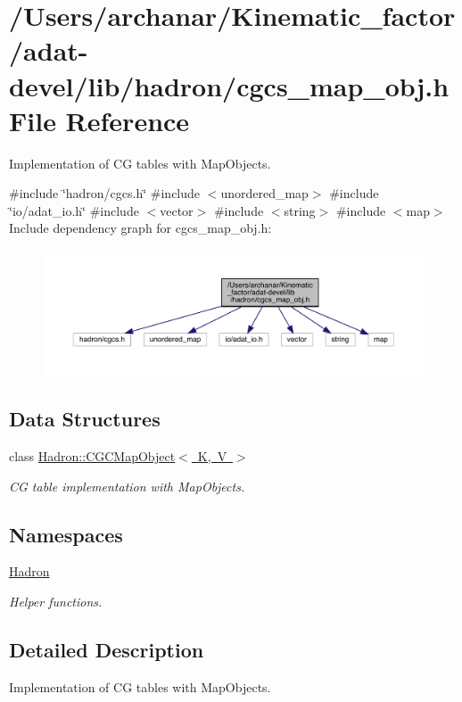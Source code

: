 \hypertarget{adat-devel_2lib_2hadron_2cgcs__map__obj_8h}{}\section{/\+Users/archanar/\+Kinematic\+\_\+factor/adat-\/devel/lib/hadron/cgcs\+\_\+map\+\_\+obj.h File Reference}
\label{adat-devel_2lib_2hadron_2cgcs__map__obj_8h}


Implementation of CG tables with Map\+Objects.  


{\ttfamily \#include \char`\"{}hadron/cgcs.\+h\char`\"{}}\newline
{\ttfamily \#include $<$unordered\+\_\+map$>$}\newline
{\ttfamily \#include \char`\"{}io/adat\+\_\+io.\+h\char`\"{}}\newline
{\ttfamily \#include $<$vector$>$}\newline
{\ttfamily \#include $<$string$>$}\newline
{\ttfamily \#include $<$map$>$}\newline
Include dependency graph for cgcs\+\_\+map\+\_\+obj.\+h\+:
\nopagebreak
\begin{figure}[H]
\begin{center}
\leavevmode
\includegraphics[width=350pt]{d1/dfe/adat-devel_2lib_2hadron_2cgcs__map__obj_8h__incl}
\end{center}
\end{figure}
\subsection*{Data Structures}
\begin{DoxyCompactItemize}
\item 
class \mbox{\hyperlink{classHadron_1_1CGCMapObject}{Hadron\+::\+C\+G\+C\+Map\+Object$<$ K, V $>$}}
\begin{DoxyCompactList}\small\item\em CG table implementation with Map\+Objects. \end{DoxyCompactList}\end{DoxyCompactItemize}
\subsection*{Namespaces}
\begin{DoxyCompactItemize}
\item 
 \mbox{\hyperlink{namespaceHadron}{Hadron}}
\begin{DoxyCompactList}\small\item\em Helper functions. \end{DoxyCompactList}\end{DoxyCompactItemize}


\subsection{Detailed Description}
Implementation of CG tables with Map\+Objects. 

